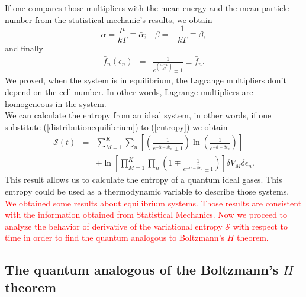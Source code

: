 \documentclass{article}
\newcommand{\de}{\delta}
\newcommand{\Ss}{\mathcal{S}}
\begin{document}
If one compares those multipliers with the mean energy and the mean particle number from the statistical mechanic's results, we obtain
\begin{equation}
    \alpha=\frac{\mu}{kT}\equiv \bar{\alpha}; \ \ \ \ \beta=-\frac{1}{kT}\equiv \bar{\beta},
\end{equation}{}
and finally
\begin{eqnarray}
    \bar{f}_{n}(\epsilon_{n})&=&\frac{1}{e^{(\frac{{\epsilon_n}-\bar{\mu}}{kT})}\pm 1}\equiv \bar{f}_{n}.
\end{eqnarray}{}
We proved, when the system is in equilibrium, the Lagrange multipliers don't depend on the cell number. In other words, Lagrange multipliers are homogeneous in the system.\\
We can calculate the entropy from an ideal system, in other words, if one substitute (\ref{distributionequilibrium}) to (\ref{entropy}) we obtain
\begin{eqnarray}
      \Ss(t)&=&\sum_{M=1}^{K} \sum_n  \left[\left(\frac{1}{e^{-\bar{\alpha}-\bar{\beta}\epsilon_{n}}\pm 1} \right)\ln \left(\frac{1}{e^{-\bar{\alpha}-\bar{\beta}\epsilon_{n}}} \right) \right]\nonumber \\
      &&\pm  \ln \left[\prod_{M=1}^{K} \prod_{n}\left(1 \mp \frac{1}{e^{-\bar{\alpha}-\bar{\beta}\epsilon_{n}}\pm 1} \right) \right] \de V_M \delta \epsilon_n\label{H-entropy}.
  \end{eqnarray}
  This result allows us to calculate the entropy of a quantum ideal gases. This entropy could be used as a thermodynamic variable to describe those systems.\\
  \textcolor{red}{We obtained some results about equilibrium systems. Those results are consistent with the information obtained from Statistical Mechanics. Now we proceed to analyze the behavior of derivative of the variational entropy $\Ss$ with respect to time in order to find the quantum analogous to Boltzmann's $H$ theorem.}
  
\subsection{The quantum analogous of the Boltzmann's $H$ theorem}
\end{document}
